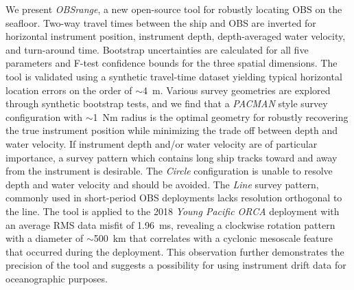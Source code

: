 We present \textit{OBSrange}, a new open-source tool for robustly locating OBS on the seafloor. Two-way travel times between the ship and OBS are inverted for horizontal instrument position, instrument depth, depth-averaged water velocity, and turn-around time. Bootstrap uncertainties are calculated for all five parameters and F-test confidence bounds for the three spatial dimensions. The tool is validated using a synthetic travel-time dataset yielding typical horizontal location errors on the order of $\sim$4~m. Various survey geometries are explored through synthetic bootstrap tests, and we find that a \textit{PACMAN} style survey configuration with $\sim$1~Nm radius is the optimal geometry for robustly recovering the true instrument position while minimizing the trade off between depth and water velocity. If instrument depth and/or water velocity are of particular importance, a survey pattern which contains long ship tracks toward and away from the instrument is desirable. The \textit{Circle} configuration is unable to resolve depth and water velocity and should be avoided. The \textit{Line} survey pattern, commonly used in short-period OBS deployments lacks resolution orthogonal to the line. The tool is applied to the 2018 \textit{Young Pacific ORCA} deployment with an average RMS data misfit of 1.96~ms, revealing a clockwise rotation pattern with a diameter of $\sim$500~km that correlates with a cyclonic mesoscale feature that occurred during the deployment. This observation further demonstrates the precision of the tool and suggests a possibility for using instrument drift data for oceanographic purposes.



